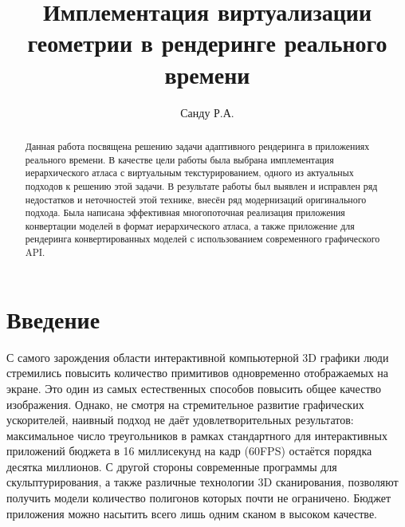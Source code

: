 \documentclass[12pt]{extarticle}
\begin{document}
\title{Имплементация виртуализации геометрии в рендеринге реального времени}

\author[1]{Санду Р.А.}

\maketitle
\begin{abstract}
Данная работа посвящена решению задачи адаптивного рендеринга в приложениях реального времени. В качестве цели работы была выбрана имплементация иерархического атласа с виртуальным текстурированием, одного из актуальных подходов к решению этой задачи. В результате работы был выявлен и исправлен ряд недостатков и неточностей этой технике, внесён ряд модернизаций оригинального подхода. Была написана эффективная многопоточная реализация приложения конвертации моделей в формат иерархического атласа, а также приложение для рендеринга конвертированных моделей с использованием современного графического API.
\end{abstract}
\thispagestyle{empty}

\newpage
\tableofcontents
\newpage

\section{Введение}
\label{sec:intro}
С самого зарождения области интерактивной компьютерной 3D графики люди стремились повысить количество примитивов одновременно отображаемых на экране. Это один из самых естественных способов повысить общее качество изображения. Однако, не смотря на стремительное развитие графических ускорителей, наивный подход не даёт удовлетворительных результатов: максимальное число треугольников в рамках стандартного для интерактивных приложений бюджета в 16 миллисекунд на кадр (60FPS) остаётся порядка десятка миллионов. С другой стороны современные программы для скульптурирования, а также различные технологии 3D сканирования, позволяют получить модели количество полигонов которых почти не ограничено. Бюджет приложения можно насытить всего лишь одним сканом в высоком качестве.
\end{document}
